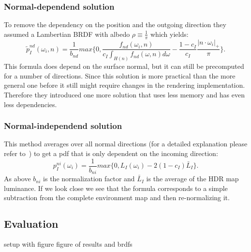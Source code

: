\subsubsection{Normal-dependend solution}
\label{sec:ibl_normal_dependent}
To remove the dependency on the position and the outgoing direction they assumed a Lambertian BRDF with albedo $ \rho \equiv \frac{1}{\pi} $
which yields: $$ \tilde{p}_I^{nd}(\omega_i, n) = \frac{1}{b_{nd}} max\{0, \frac{f_{nd}(\omega_i, n)}{c_I \int_{H(n)} f_{nd}(\omega, n) d\omega} - \frac{1 - c_I}{c_I} \frac{|n \cdot \omega_i|_+}{\pi}\}. $$
This formula does depend on the surface normal,
but it can still be precomputed for a number of directions.
Since this solution is more practical than the more general one before it still might require changes in the rendering implementation.
Therefore they introduced one more solution that uses less memory and has even less dependencies.


\subsubsection{Normal-independend solution}
\label{sec:ibl_normal_independend}
This method averages over all normal directions (for a detailed explanation please refer to~\cite[Appendix~D]{Karlik2019})
to get a pdf that is only dependent on the incoming direction: $$ p_I^{ni}(\omega_i) = \frac{1}{b_{ni}} max\{0, L_I(\omega_i) - 2 (1 - c_I) \bar{L}_I\}. $$
As above $ b_{ni} $ is the normalization factor and $ \bar{L}_I $ is the average of the HDR map luminance.
If we look close we see that the formula corresponds to a simple subtraction from the complete environment map and then re-normalizing it.


\subsection{Evaluation}
\label{sec:ibl_evalutiona}
setup with figure
figure of results and brdfs








